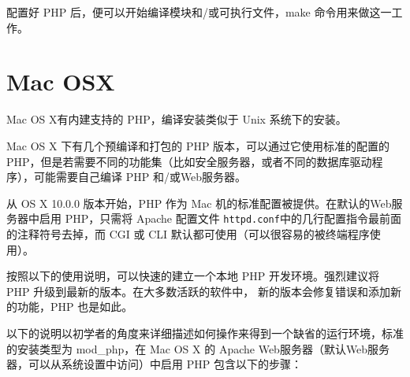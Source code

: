 配置好 PHP 后，便可以开始编译模块和/或可执行文件，make 命令用来做这一工作。




\section{Mac OSX}

Mac OS X有内建支持的 PHP，编译安装类似于 Unix 系统下的安装。

Mac OS X 下有几个预编译和打包的 PHP 版本，可以通过它使用标准的配置的 PHP，但是若需要不同的功能集（比如安全服务器，或者不同的数据库驱动程序），可能需要自己编译 PHP 和/或Web服务器。

从 OS X 10.0.0 版本开始，PHP 作为 Mac 机的标准配置被提供。在默认的Web服务器中启用 PHP，只需将 Apache 配置文件 \texttt{httpd.conf}中的几行配置指令最前面的注释符号去掉，而 CGI 或 CLI 默认都可使用（可以很容易的被终端程序使用）。

按照以下的使用说明，可以快速的建立一个本地 PHP 开发环境。强烈建议将 PHP 升级到最新的版本。在大多数活跃的软件中， 新的版本会修复错误和添加新的功能，PHP 也是如此。

以下的说明以初学者的角度来详细描述如何操作来得到一个缺省的运行环境，标准的安装类型为 mod\_php，在 Mac OS X 的 Apache Web服务器（默认Web服务器，可以从系统设置中访问）中启用 PHP 包含以下的步骤：

